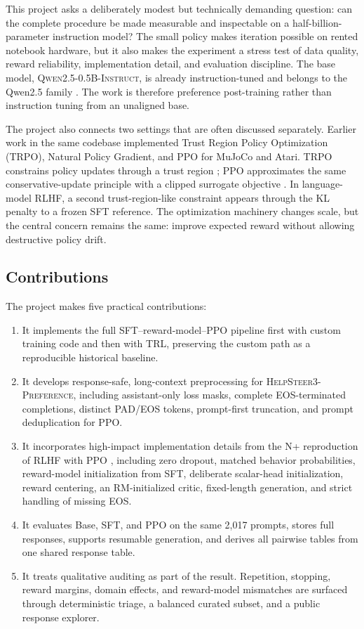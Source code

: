 \documentclass[11pt]{article}
\newcommand{\model}{\textsc{Qwen2.5-0.5B-Instruct}}
\newcommand{\dataset}{\textsc{HelpSteer3-Preference}}
\newcommand{\trl}{\textsc{TRL}}
\begin{document}
This project asks a deliberately modest but technically demanding question:
can the complete procedure be made measurable and inspectable on a
half-billion-parameter instruction model? The small policy makes iteration
possible on rented notebook hardware, but it also makes the experiment a
stress test of data quality, reward reliability, implementation detail, and
evaluation discipline. The base model, \model{}, is already instruction-tuned
and belongs to the Qwen2.5 family \cite{qwen25}. The work is therefore
preference post-training rather than instruction tuning from an unaligned base.

The project also connects two settings that are often discussed separately.
Earlier work in the same codebase implemented Trust Region Policy Optimization
(TRPO), Natural Policy Gradient, and PPO for MuJoCo and Atari. TRPO constrains
policy updates through a trust region \cite{schulman2015}; PPO approximates the
same conservative-update principle with a clipped surrogate objective
\cite{schulman2017}. In language-model RLHF, a second trust-region-like
constraint appears through the KL penalty to a frozen SFT reference. The
optimization machinery changes scale, but the central concern remains the
same: improve expected reward without allowing destructive policy drift.

\subsection{Contributions}

The project makes five practical contributions:

\begin{enumerate}
  \item It implements the full SFT--reward-model--PPO pipeline first with
  custom training code and then with \trl{}, preserving the custom path as a
  reproducible historical baseline.
  \item It develops response-safe, long-context preprocessing for
  \dataset{}, including assistant-only loss masks, complete EOS-terminated
  completions, distinct PAD/EOS tokens, prompt-first truncation, and prompt
  deduplication for PPO.
  \item It incorporates high-impact implementation details from the N+
  reproduction of RLHF with PPO \cite{huang2024}, including zero dropout,
  matched behavior probabilities, reward-model initialization from SFT,
  deliberate scalar-head initialization, reward centering, an
  RM-initialized critic, fixed-length generation, and strict handling of
  missing EOS.
  \item It evaluates Base, SFT, and PPO on the same 2,017 prompts, stores full
  responses, supports resumable generation, and derives all pairwise tables
  from one shared response table.
  \item It treats qualitative auditing as part of the result. Repetition,
  stopping, reward margins, domain effects, and reward-model mismatches are
  surfaced through deterministic triage, a balanced curated subset, and a
  public response explorer.
\end{enumerate}
\end{document}
